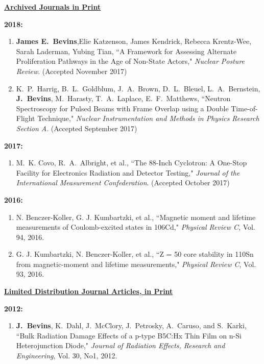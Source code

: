 \underline{\textbf{Archived Journals in Print}}

\textbf{2018:}
\begin{enumerate}
  \item \textbf{James E.\ Bevins},Elie Katzenson, James Kendrick, Rebecca Krentz-Wee, Sarah Laderman, Yubing Tian, ``A Framework for Assessing Alternate Proliferation Pathways in the Age of Non-State Actors," \textit{Nuclear Posture Review}. (Accepted November 2017)
  
  \item K.\ P.\ Harrig, B.\ L.\ Goldblum, J.\ A.\ Brown, D.\ L.\ Bleuel, L.\ A.\ Bernstein, \textbf{J.\ Bevins}, M.\ Harasty, T.\ A.\ Laplace, E.\ F.\ Matthews, ``Neutron Spectroscopy for Pulsed Beams with Frame Overlap using a Double Time-of-Flight Technique," \textit{Nuclear Instrumentation and Methods in Physics Research Section A}. (Accepted September 2017)
\end{enumerate}

\textbf{2017:}
\begin{enumerate}
\item M.\ K. Covo, R.\ A.\ Albright, et al., ``The 88-Inch Cyclotron: A One-Stop Facility for Electronics Radiation and Detector Testing," \textit{Journal of the International Measurement Confederation}. (Accepted October 2017)
\end{enumerate}

\textbf{2016:}
\begin{enumerate}
  \item N. Benczer-Koller, G. J. Kumbartzki, et al., ``Magnetic moment and lifetime measurements of Coulomb-excited states in 106Cd," \textit{Physical Review C}, Vol. 94, 2016.
  
  \item G. J. Kumbartzki, N. Benczer-Koller, et al., ``Z = 50 core stability in 110Sn from magnetic-moment and lifetime measurements," \textit{Physical Review C}, Vol. 93, 2016.
\end{enumerate}


\underline{\textbf{Limited Distribution Journal Articles, in Print }}

\textbf{2012:}
\begin{enumerate}
  \item \textbf{J.\ Bevins}, K.\ Dahl, J.\ McClory, J.\ Petrosky, A.\ Caruso, and S.\ Karki, ``Bulk Radiation Damage Effects of a p-type B5C:Hx Thin Film on n-Si Heterojunction Diode," \textit{Journal of Radiation Effects, Research and Engineering}, Vol. 30, No1, 2012.
\end{enumerate}

